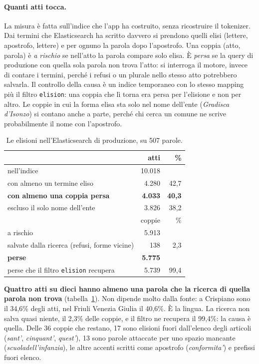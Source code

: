 \paragraph{Quanti atti tocca.} La misura è fatta sull'indice che l'app ha costruito,
senza ricostruire il tokenizer. Dai termini che Elasticsearch ha scritto davvero
si prendono quelli elisi (lettere, apostrofo, lettere) e per ognuno la parola
dopo l'apostrofo. Una coppia (atto, parola) è \emph{a rischio} se nell'atto la
parola compare solo elisa. È \emph{persa} se la query di produzione con quella sola
parola non trova l'atto: si interroga il motore, invece di contare i termini,
perché i refusi o un plurale nello stesso atto potrebbero salvarla. Il
controllo della causa è un indice temporaneo con lo stesso mapping più il filtro
\texttt{elision}: una coppia che lì torna era persa per l'elisione e non per
altro. Le coppie in cui la forma elisa sta solo nel nome dell'ente
(\emph{Gradisca d'Isonzo}) si contano anche a parte, perché chi cerca un comune ne
scrive probabilmente il nome con l'apostrofo.

\begin{table}[ht]
  \centering
  \begin{tabular}{lrr}
    \toprule
    & atti & \% \\
    \midrule
    nell'indice & 10.018 & \\
    con almeno un termine eliso & 4.280 & 42,7 \\
    \textbf{con almeno una coppia persa} & \textbf{4.033} & \textbf{40,3} \\
    \quad escluso il solo nome dell'ente & 3.826 & 38,2 \\
    \midrule
    & coppie & \% \\
    \midrule
    a rischio & 5.913 & \\
    salvate dalla ricerca (refusi, forme vicine) & 138 & 2,3 \\
    \textbf{perse} & \textbf{5.775} & \\
    perse che il filtro \texttt{elision} recupera & 5.739 & 99,4 \\
    \bottomrule
  \end{tabular}
  \caption{Le elisioni nell'Elasticsearch di produzione, su 507 parole.}
  \label{tab:elisioni}
\end{table}

\textbf{Quattro atti su dieci hanno almeno una parola che la ricerca di quella
parola non trova} (tabella~\ref{tab:elisioni}). Non dipende molto dalla fonte: a
Crispiano sono il 34,6\% degli atti, nel Friuli Venezia Giulia il 40,6\%. È la
lingua. La ricerca non salva quasi niente, il 2,3\% delle coppie, e il filtro ne
recupera il 99,4\%: la causa è quella. Delle 36 coppie che restano, 17 sono
elisioni fuori dall'elenco degli articoli (\emph{sant'}, \emph{cinquant'},
\emph{quest'}), 13 sono parole attaccate per uno spazio mancante
(\emph{scuoladell'infanzia}), le altre accenti scritti come apostrofo
(\emph{conformita'}) e prefissi fuori elenco.

